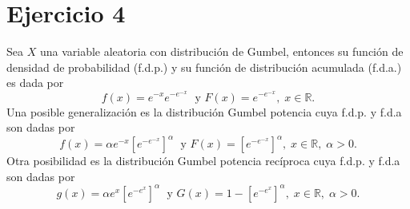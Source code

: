 \documentclass[11pt]{article}
\renewcommand{\=}[1]{\stackrel{#1}{=}} %
\theoremstyle{definition}
\theoremstyle{remark}
\begin{document}
\section*{Ejercicio 4}
Sea $X$ una variable aleatoria con distribución de Gumbel, entonces su función de densidad de probabilidad (f.d.p.) y su función de distribución acumulada (f.d.a.) es dada por
$$f(x)=e^{-x}e^{-e^{-x}}\;\mbox{ y }F(x)=e^{-e^{-x}},\;x\in\mathbb{R}.$$
Una posible generalización es la distribución Gumbel potencia cuya f.d.p. y f.d.a son dadas por
$$f(x)=\alpha e^{-x}\left[e^{-e^{-x}}\right]^{\alpha}\;\mbox{ y }F(x)=\left[e^{-e^{-x}}\right]^{\alpha},\;x\in\mathbb{R},\;\alpha>0.$$
Otra posibilidad es la distribución Gumbel potencia recíproca cuya f.d.p. y f.d.a son dadas por
$$g(x)=\alpha e^{x}\left[e^{-e^{x}}\right]^{\alpha}\;\mbox{ y }G(x)=1-\left[e^{-e^{x}}\right]^{\alpha},\;x\in\mathbb{R},\;\alpha>0.$$
\end{document}
